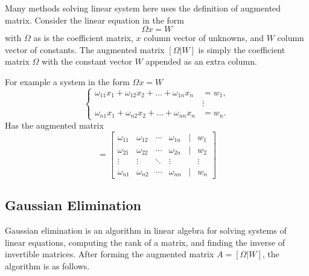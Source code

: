 \documentclass[../../../main.tex]{subfiles}
\begin{document}
Many methods solving linear system here uses the definition of augmented matrix.
Consider the linear  equation in the form
\begin{equation*}
    \Omega x=W
\end{equation*}
with $\Omega$ as is the coefficient matrix, $x$ column vector of unknowns, and $W$ column vector of constants.
The augmented matrix $[\Omega|W]$ is simply the coefficient matrix $\Omega$ with the constant vector $W$ appended as an extra column.

For example a system in the form $\Omega x=W$
\begin{equation*}
    \begin{cases}
        \omega_{11}x_1 + \omega_{12}x_2 + \dots + \omega_{1n}x_n & = w_1, \\
                                                                 & \vdots \\
        \omega_{n1}x_1 + \omega_{n2}x_2 + \dots + \omega_{nn}x_n & = w_n.
    \end{cases}
\end{equation*}
Has the augmented matrix
\begin{equation*}
    [\Omega|W] =
    \begin{bmatrix}
        \omega_{11} & \omega_{12} & \cdots & \omega_{1n} & | & w_1    \\
        \omega_{21} & \omega_{22} & \cdots & \omega_{2n} & | & w_2    \\
        \vdots      & \vdots      & \ddots & \vdots      &   & \vdots \\
        \omega_{n1} & \omega_{n2} & \cdots & \omega_{nn} & | & w_n
    \end{bmatrix}
\end{equation*}

\subsection{Gaussian Elimination}
Gaussian elimination is an algorithm in linear algebra for solving systems of linear equations, computing the rank of a matrix, and finding the inverse of invertible matrices.
After forming the augmented matrix $A=[\Omega|W]$, the algorithm is as follows.
\end{document}
